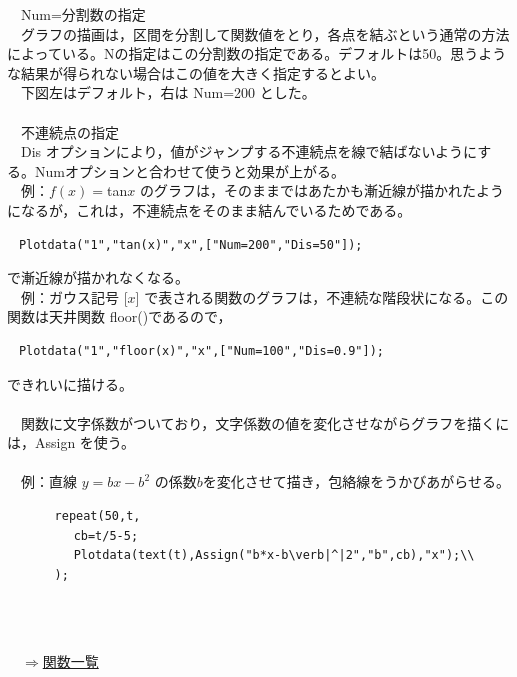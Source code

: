 \documentclass[papersize,a4paper,12pt,uplatex]{jsarticle}
\begin{document}
\begin{description}
　Num=分割数の指定\\
　グラフの描画は，区間を分割して関数値をとり，各点を結ぶという通常の方法によっている。Nの指定はこの分割数の指定である。デフォルトは50。思うような結果が得られない場合はこの値を大きく指定するとよい。\\
　下図左はデフォルト，右は Num=200 とした。\\

　　　　\\

　不連続点の指定\\
　Dis オプションにより，値がジャンプする不連続点を線で結ばないようにする。Numオプションと合わせて使うと効果が上がる。\\

　例：$f(x)=$tan$x$ のグラフは，そのままではあたかも漸近線が描かれたようになるが，これは，不連続点をそのまま結んでいるためである。
\begin{verbatim}
　Plotdata("1","tan(x)","x",["Num=200","Dis=50"]);
\end{verbatim}
で漸近線が描かれなくなる。\\

　例：ガウス記号 [$x$] で表される関数のグラフは，不連続な階段状になる。この関数は天井関数 floor()であるので，
\begin{verbatim}
　Plotdata("1","floor(x)","x",["Num=100","Dis=0.9"]);
\end{verbatim}
できれいに描ける。\\

　　　　　　　\\

　関数に文字係数がついており，文字係数の値を変化させながらグラフを描くには，Assign を使う。\\
　\\
　例：直線 $y=bx-b^2$ の係数$b$を変化させて描き，包絡線をうかびあがらせる。
\begin{verbatim}
　　　　repeat(50,t,
 　　　　　cb=t/5-5;
 　　　　　Plotdata(text(t),Assign("b*x-b\verb|^|2","b",cb),"x");\\
　　　　);
\end{verbatim}
　\\
　　　　　　\\

\begin{flushright}　\hyperlink{functionlist}{$\Rightarrow$関数一覧}\end{flushright}


\end{description}
\end{document}
